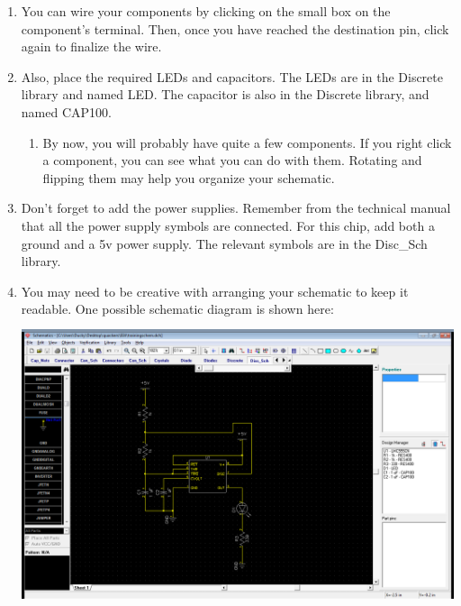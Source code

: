 \documentclass[letterpaper]{article}
\newcounter{saveenum}
\newcommand\liststyleRTFNumvi{%
\renewcommand\theenumi{\arabic{enumi}}
\renewcommand\theenumii{\alph{enumii}}
\renewcommand\theenumiii{\roman{enumiii}}
\renewcommand\theenumiv{\arabic{enumiv}}
\renewcommand\labelenumi{\theenumi.}
\renewcommand\labelenumii{\theenumii.}
\renewcommand\labelenumiii{\theenumiii.}
\renewcommand\labelenumiv{\theenumiv.}
}
\begin{document}
\liststyleRTFNumvi
\setcounter{saveenum}{\value{enumi}}
\begin{enumerate}
\setcounter{enumi}{\value{saveenum}}
\item {\sffamily\color[rgb]{0.30980393,0.5058824,0.7411765}
You can wire your components by clicking on the small box on the component's terminal. Then, once you have reached the
destination pin, click again to finalize the wire.}
\item {\sffamily\color[rgb]{0.30980393,0.5058824,0.7411765}
Also, place the required LEDs and capacitors. The LEDs are in the {\textquotedbl}Discrete{\textquotedbl} library and
named {\textquotedbl}LED.{\textquotedbl} The capacitor is also in the {\textquotedbl}Discrete{\textquotedbl} library,
and named {\textquotedbl}CAP100.{\textquotedbl}}

\setcounter{saveenum}{\value{enumii}}
\begin{enumerate}
\setcounter{enumii}{\value{saveenum}}
\item {\sffamily\color[rgb]{0.30980393,0.5058824,0.7411765}
By now, you will probably have quite a few components. If you right click a component, you can see what you can do with
them. Rotating and flipping them may help you organize your schematic.}
\end{enumerate}
\item {\sffamily\color[rgb]{0.30980393,0.5058824,0.7411765}
Don't forget to add the power supplies. Remember from the technical manual that all the power supply symbols are
connected. For this chip, add both a ground and a 5v power supply. The relevant symbols are in the
{\textquotedbl}Disc\_Sch{\textquotedbl} library.}
\item {\sffamily\color[rgb]{0.30980393,0.5058824,0.7411765}
You may need to be creative with arranging your schematic to keep it readable. One possible schematic diagram is shown
here:\newline
 \includegraphics[width=5.4in,height=3.3665in]{figures/ee4document-img021.png} \newline
 }
\end{enumerate}
\end{document}

